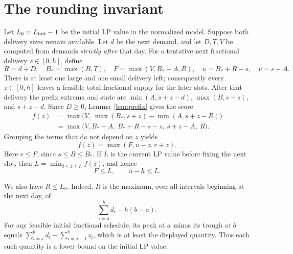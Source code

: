 \documentclass[11pt]{article}
\begin{document}
\section{The rounding invariant}\label{sec:invariant}
Let $L_0=L_{\rm init}-1$ be the initial LP value in the normalized model.
Suppose both delivery sizes remain available. Let $d$ be the next demand,
and let $D,T,V$ be computed from demands \emph{strictly after} that day.
For a tentative next fractional delivery $z\in[0,h]$, define
\[
R=d+D,\quad B_* =\max(B,T),\quad
F=\max(V,B_*-A,R),\quad
u=B_*+R-s,\quad v=s-A.
\]
There is at least one large and one small delivery left; consequently every
$z\in[0,h]$ leaves a feasible total fractional supply for the later slots.
After that delivery the prefix extrema and state are
$\min(A,s+z-d)$, $\max(B,s+z)$, and $s+z-d$.
Since $D\ge0$, Lemma~\ref{lem:prefix} gives the score
\begin{align*}
f(z)
 &=\max\bigl(V,\ \max(B_*,s+z)-\min(A,s+z-R)\bigr)\\
 &=\max\bigl(V,B_*-A,\ B_*+R-s-z,\ s+z-A,\ R\bigr).
\end{align*}
Grouping the terms that do not depend on $z$ yields
\begin{equation}\label{eq:score}
f(z)=\max(F,u-z,v+z).
\end{equation}
Here $v\le F$, since $s\le B\le B_*$.
If $L$ is the current LP value before fixing the next slot, then
$L=\min_{0\le z\le h} f(z)$, and hence
\begin{equation}\label{eq:lower}
F\le L,\qquad u-h\le L.
\end{equation}

We also have $R\le L_0$. Indeed, $R$ is the maximum, over all intervals
beginning at the next day, of
\[
\sum_{i=a}^b d_i-h(b-a).
\]
For any feasible initial fractional schedule, its peak at $a$ minus its
trough at $b$ equals
$\sum_{i=a}^b d_i-\sum_{i=a+1}^b z_i$, which is at least the displayed
quantity. Thus each such quantity is a lower bound on the initial LP value.
\end{document}
